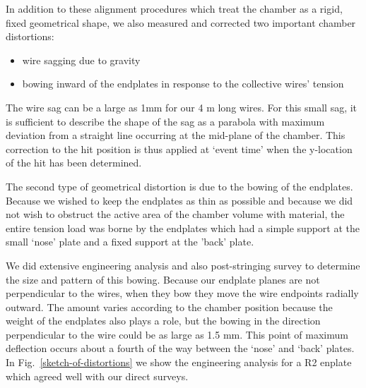 In addition to these alignment procedures which treat the chamber as a rigid, fixed
geometrical shape, we also measured and corrected two important chamber distortions:
\begin{itemize}
\item wire sagging due to gravity
\item bowing inward of the endplates in response to the collective wires' tension
\end{itemize}

The wire sag can be a large as 1mm for our 4 m long wires.  For this small
sag, it is sufficient to describe the shape of the sag as a parabola with
maximum deviation from a straight line occurring at the mid-plane of the chamber.
This correction to the hit position is thus applied at `event time' when 
the y-location of the hit has been determined.

The second type of geometrical distortion is due to the bowing of the endplates.
Because we wished to keep the endplates as thin as possible and because we did
not wish to obstruct the active area of the chamber volume with material, the
entire tension load was borne by the endplates which had a simple support at the
small `nose' plate and a fixed support at the 'back' plate.

We did extensive engineering analysis and also post-stringing survey to determine the
size and pattern of this bowing.  Because our endplate planes are not perpendicular to
the wires, when they bow they move the wire endpoints radially outward.  The amount varies
according to the chamber position because the weight of the endplates also plays a role,
but the bowing in the direction perpendicular to the wire could be as large as 1.5 mm.
This point of maximum deflection occurs about a fourth of the way between the `nose' and
`back' plates.  In Fig.~\ref{sketch-of-distortions} we show the engineering analysis
for a R2 enplate which agreed well with our direct surveys.

